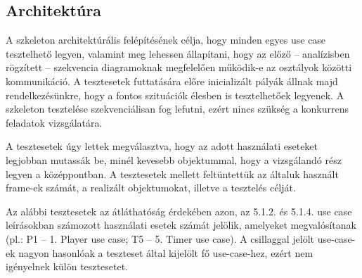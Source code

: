 	\subsection{Architektúra}
		A szkeleton architektúrális felépítésének célja, hogy minden egyes use case tesztelhető legyen, valamint meg lehessen állapítani, hogy az előző -- analízisben rögzített -- szekvencia diagramoknak megfelelően működik-e az osztályok közötti kommunikáció. A tesztesetek futtatására előre inicializált pályák állnak majd rendelkezésünkre, hogy a fontos szituációk élesben is tesztelhetőek legyenek. A szkeleton tesztelése szekvenciálisan fog lefutni, ezért nincs szükség a konkurrens feladatok vizsgálatára.
		
		A tesztesetek úgy lettek megválasztva, hogy az adott használati eseteket legjobban mutassák be, minél kevesebb objektummal, hogy a vizsgálandó rész legyen a középpontban. A tesztesetek mellett feltüntettük az általuk használt frame-ek számát, a realizált objektumokat, illetve a tesztelés célját.
		
		Az alábbi tesztesetek az átláthatóság érdekében azon, az 5.1.2. és 5.1.4. use case leírásokban számozott használati esetek számát jelölik, amelyeket megvalósítanak (pl.: P1 -- 1. Player use case; T5 -- 5. Timer use case). A csillaggal jelölt use-case-ek nagyon hasonlóak a teszteset által kijelölt fő use-case-hez, ezért nem igényelnek külön tesztesetet.
								
